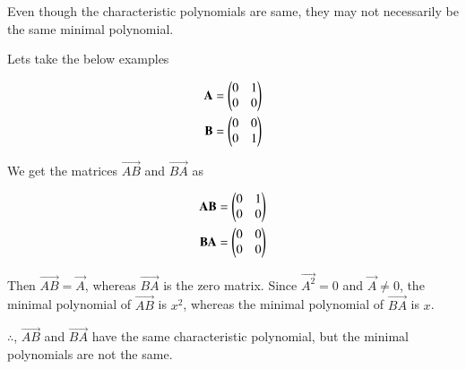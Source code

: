 \documentclass[journal,12pt,twocolumn]{IEEEtran}
\begin{document}
	Even though the characteristic polynomials are same, they may not necessarily be the same minimal polynomial.
	
	Lets take the below examples
	
	\begin{align}
		\mathbf{A} = \begin{pmatrix}0&1\\0&0\end{pmatrix} \\
		\mathbf{B} = \begin{pmatrix}0&0\\0&1\end{pmatrix}
	\end{align}

	We get the matrices $\vec{AB}$ and $\vec{BA}$ as
	
	\begin{align}
		\mathbf{AB} = \begin{pmatrix}0&1\\0&0\end{pmatrix} \\
		\mathbf{BA} = \begin{pmatrix}0&0\\0&0\end{pmatrix}
	\end{align}

	Then $\vec{AB} = \vec{A}$, whereas $\vec{BA}$ is the zero matrix. Since $\vec{A^2} = 0$ and $\vec{A} \neq 0$, the minimal polynomial of $\vec{AB}$ is $x^2$, whereas the minimal polynomial of $\vec{BA}$ is $x$.
	
	$\therefore$, $\vec{AB}$ and $\vec{BA}$ have the same characteristic polynomial, but the minimal polynomials are not the same.
	
	
\end{document}
